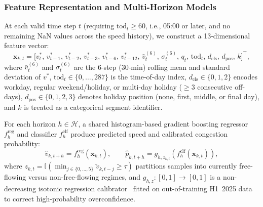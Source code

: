 \documentclass[conference]{IEEEtran}
\begin{document}
\subsubsection{Feature Representation and Multi-Horizon Models}
At each valid time step $t$ (requiring $\text{tod}_t \ge 60$, i.e., 05:00 or later, and no remaining NaN values across the speed history), we construct a 13-dimensional feature vector:
\begin{equation}
\mathbf{x}_{k,t} = \big[v^*_{t},\, v^*_{t-1},\, v^*_{t-2},\, v^*_{t-3},\, v^*_{t-6},\, v^*_{t-12},\, \bar{v}^{(6)}_t,\, \sigma^{(6)}_t,\, q_t,\, \text{tod}_t,\, d_{\text{cls}},\, d_{\text{pos}},\, k\big]^\top,
\label{eq:features}
\end{equation}
where $\bar{v}^{(6)}_t$ and $\sigma^{(6)}_t$ are the 6-step (30-min) rolling mean and standard deviation of $v^*$, $\text{tod}_t \in \{0,\dots,287\}$ is the time-of-day index, $d_{\text{cls}} \in \{0,1,2\}$ encodes workday, regular weekend/holiday, or multi-day holiday ($\ge 3$ consecutive off-days), $d_{\text{pos}} \in \{0,1,2,3\}$ denotes holiday position (none, first, middle, or final day), and $k$ is treated as a categorical segment identifier.

For each horizon $h \in \mathcal{H}$, a shared histogram-based gradient boosting regressor $f^{\text{reg}}_h$ and classifier $f^{\text{clf}}_h$ produce predicted speed and calibrated congestion probability:
\begin{equation}
\hat{v}_{k,t+h} = f^{\text{reg}}_h(\mathbf{x}_{k,t}), \qquad
\hat{p}_{k,t+h} = g_{h, z_{k,t}}\!\left(f^{\text{clf}}_h(\mathbf{x}_{k,t})\right),
\label{eq:predict_calib}
\end{equation}
where $z_{k,t} = \mathbb{I}\!\left(\min_{j \in \{0,\dots,5\}} \tilde{v}_{k,t-j} \ge \tau\right)$ partitions samples into currently free-flowing versus non-free-flowing regimes, and $g_{h,z}: [0,1] \to [0,1]$ is a non-decreasing isotonic regression calibrator~\cite{zadrozny2002isotonic} fitted on out-of-training H1~2025 data to correct high-probability overconfidence.
\end{document}
